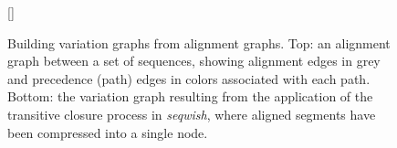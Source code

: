 \vspace{-1em}
\begin{figure}[ht!]
    [\FBwidth]
    {\caption{ Building variation graphs from alignment graphs. Top: an alignment graph between a set of sequences,
        showing alignment edges in grey and precedence (path) edges in colors associated with each path. Bottom: the variation graph
        resulting from the application of the transitive closure process in \textit{seqwish}, where aligned segments have been
        compressed into a single node.
    }\label{fig:from_alignment_to_variation_graph}}

\end{figure}
\vspace{-1em}